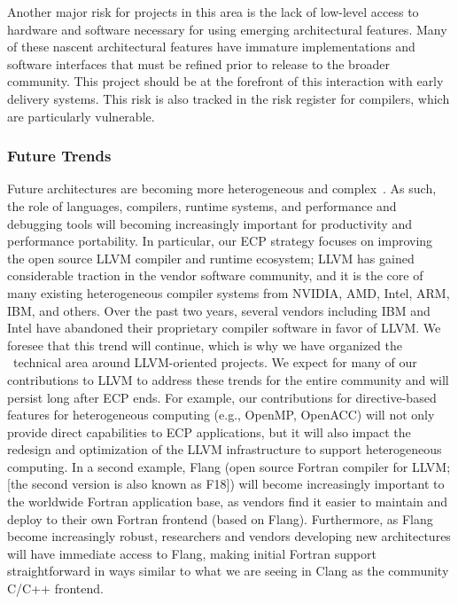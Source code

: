 Another major risk for projects in this area is the lack of low-level access to hardware and software necessary for using emerging architectural features. Many of these nascent architectural features have immature implementations and software interfaces that must be refined prior to release to the broader community. This project should be at the forefront of this interaction with early delivery systems. This risk is also tracked in the risk register for compilers, which are particularly vulnerable.

\subsubsection{Future Trends}

Future architectures are becoming more heterogeneous and complex~\cite{vetter:2018:extreme}. As such, the role of languages, compilers, runtime systems, and performance and debugging tools will becoming increasingly important for productivity and performance portability. 
%
In particular, our ECP strategy focuses on improving the open source LLVM compiler and runtime ecosystem; LLVM has gained considerable traction in the vendor software community, and it is the core of many existing heterogeneous compiler systems from NVIDIA, AMD, Intel, ARM, IBM, and others. 
Over the past two years, several vendors including IBM and Intel have abandoned their proprietary compiler software in favor of LLVM. 
We foresee that this trend will continue, which is why we have organized the \tools\ technical area around LLVM-oriented projects.  
%
We expect for many of our contributions to LLVM to address these trends for the entire community and will persist long after ECP ends. 
%
For example, our contributions for directive-based features for heterogeneous computing (e.g., OpenMP, OpenACC) will not only provide direct capabilities to ECP applications, but it will also impact the redesign and optimization of the LLVM infrastructure to support heterogeneous computing.
%
In a second example, Flang (open source Fortran compiler for LLVM; [the second version is also known as F18]) will become increasingly important to the worldwide Fortran application base, as vendors find it easier to maintain and deploy to their own Fortran frontend (based on Flang).  
%
Furthermore, as Flang become increasingly robust, researchers and vendors developing new architectures will have immediate access to Flang, making initial Fortran support straightforward in ways similar to what we are seeing in Clang as the community C/C++ frontend.

%
